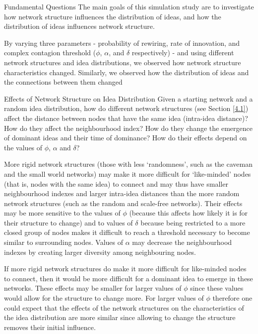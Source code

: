 \documentclass{beamer}
\begin{document}
\begin{frame}
{Fundamental Questions}
The main goals of this simulation study are to investigate how network structure influences the distribution of ideas, and how the distribution of ideas influences network structure.

By varying three parameters - probability of rewiring, rate of innovation, and complex contagion threshold ($\phi$, $\alpha$, and $\delta$ respectively) - and using different network structures and idea distributions, we observed how network structure characteristics changed. Similarly, we observed how the distribution of ideas and the connections between them changed
\end{frame}
%	
\begin{frame}
{Effects of Network Structure on Idea Distribution}
Given a starting network and a random idea distribution, how do different network structures (see Section \ref{4.1}) affect the distance between nodes that have the same idea (intra-idea distance)? How do they affect the neighbourhood index? How do they change the emergence of dominant ideas and their time of dominance? How do their effects depend on the values of $\phi$, $\alpha$ and $\delta$?
\end{frame}
%
\begin{frame}
More rigid network structures (those with less `randomness', such as the caveman and the small world networks) may make it more difficult for `like-minded' nodes (that is, nodes with the same idea) to connect and may thus have smaller neighbourhood indexes and larger intra-idea distances than the more random network structures (such as the random and scale-free networks). Their effects may be more sensitive to the values of $\phi$ (because this affects how likely it is for their structure to change) and to values of $\delta$ because being restricted to a more closed group of nodes makes it difficult to reach a threshold necessary to become similar to surrounding nodes. Values of $\alpha$ may decrease the neighbourhood indexes by creating larger diversity among neighbouring nodes.
\end{frame}
%
\begin{frame}
If more rigid network structures do make it more difficult for like-minded nodes to connect, then it would be more difficult for a dominant idea to emerge in these networks. These effects may be smaller for larger values of $\phi$ since these values would allow for the structure to change more. For larger values of $\phi$ therefore one could expect that the effects of the network structures on the characteristics of the idea distribution are more similar since allowing to change the structure removes their initial influence.
\end{frame}
\end{document}
